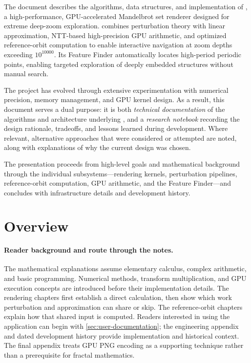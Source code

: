 
The document describes the algorithms, data structures, and implementation
of \FractalShark{}, a high-performance, GPU-accelerated Mandelbrot set
renderer designed for extreme deep-zoom exploration.  \FractalShark{}
combines perturbation theory with linear approximation, NTT-based
high-precision GPU arithmetic, and optimized reference-orbit computation to
enable interactive navigation at zoom depths exceeding $10^{10000}$.  Its
Feature Finder automatically locates high-period periodic points, enabling
targeted exploration of deeply embedded structures without manual search.

The project has evolved through extensive experimentation with numerical
precision, memory management, and GPU kernel design.  As a result, this
document serves a dual purpose: it is both \emph{technical documentation}
of the algorithms and architecture underlying \FractalShark{}, and a
\emph{research notebook} recording the design rationale, tradeoffs, and
lessons learned during development.  Where relevant, alternative
approaches that were considered or attempted are noted, along with
explanations of why the current design was chosen.

The presentation proceeds from high-level goals and mathematical background
through the individual subsystems---rendering kernels, perturbation
pipelines, reference-orbit computation, GPU arithmetic, and the Feature
Finder---and concludes with infrastructure details and development history.

\section{\FractalShark{} Overview}
\label{sec:goal}

\paragraph{Reader background and route through the notes.}
The mathematical explanations assume elementary calculus, complex arithmetic, and
basic programming. Numerical methods, transform multiplication, and GPU execution
concepts are introduced before their implementation details. The rendering chapters
first establish a direct calculation, then show which work perturbation and
approximation can share or skip. The reference-orbit chapters explain how that shared
input is computed. Readers interested in using the application can begin with
\cref{sec:user-documentation}; the engineering appendix and dated development history
provide implementation and historical context. The final appendix treats GPU PNG
encoding as a supporting technique rather than a prerequisite for fractal mathematics.

